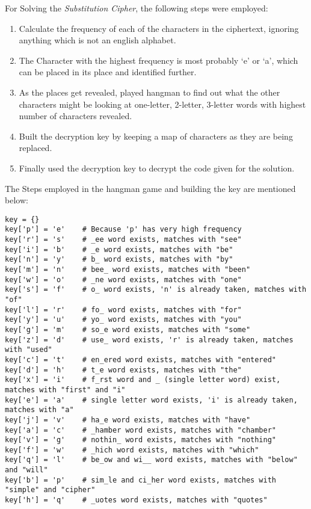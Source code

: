 \documentclass[10pt,twoside]{article}
\begin{document}
For Solving the \textit{Substitution Cipher}, the following steps were employed:
\begin{enumerate}
  \setlength\itemsep{0em}
    \item Calculate the frequency of each of the characters in the ciphertext, ignoring anything which is not an english alphabet.
    \item The Character with the highest frequency is most probably `e' or `a', which can be placed in its place and identified further.
    \item As the places get revealed, played hangman to find out what the other characters might be looking at one-letter, 2-letter, 3-letter words with highest number of characters revealed.
    \item Built the decryption key by keeping a map of characters as they are being replaced.
    \item Finally used the decryption key to decrypt the code given for the solution.
\end{enumerate}

The Steps employed in the hangman game and building the key are mentioned below:
\begin{verbatim}
key = {}
key['p'] = 'e'    # Because 'p' has very high frequency
key['r'] = 's'    # _ee word exists, matches with "see"
key['i'] = 'b'    # _e word exists, matches with "be"
key['n'] = 'y'    # b_ word exists, matches with "by"
key['m'] = 'n'    # bee_ word exists, matches with "been"
key['w'] = 'o'    # _ne word exists, matches with "one"
key['s'] = 'f'    # o_ word exists, 'n' is already taken, matches with "of"
key['l'] = 'r'    # fo_ word exists, matches with "for"
key['y'] = 'u'    # yo_ word exists, matches with "you"
key['g'] = 'm'    # so_e word exists, matches with "some"
key['z'] = 'd'    # use_ word exists, 'r' is already taken, matches with "used"
key['c'] = 't'    # en_ered word exists, matches with "entered"
key['d'] = 'h'    # t_e word exists, matches with "the"
key['x'] = 'i'    # f_rst word and _ (single letter word) exist, matches with "first" and "i"
key['e'] = 'a'    # single letter word exists, 'i' is already taken, matches with "a"
key['j'] = 'v'    # ha_e word exists, matches with "have"
key['a'] = 'c'    # _hamber word exists, matches with "chamber"
key['v'] = 'g'    # nothin_ word exists, matches with "nothing"
key['f'] = 'w'    # _hich word exists, matches with "which"
key['q'] = 'l'    # be_ow and wi__ word exists, matches with "below" and "will"
key['b'] = 'p'    # sim_le and ci_her word exists, matches with "simple" and "cipher"
key['h'] = 'q'    # _uotes word exists, matches with "quotes"
\end{verbatim}
\end{document}
